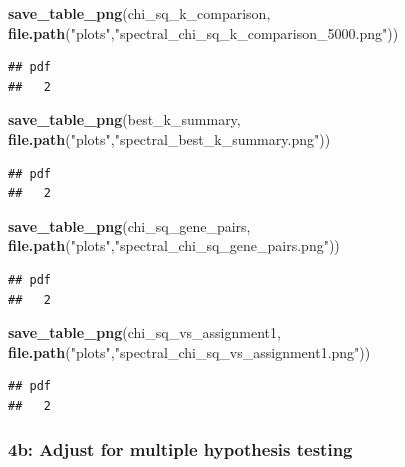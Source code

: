 \documentclass[
]{article}
\newenvironment{Shaded}{\begin{snugshade}}{\end{snugshade}}
\newcommand{\FunctionTok}[1]{\textcolor[rgb]{0.13,0.29,0.53}{\textbf{#1}}}
\newcommand{\NormalTok}[1]{#1}
\newcommand{\StringTok}[1]{\textcolor[rgb]{0.31,0.60,0.02}{#1}}
\begin{document}
\begin{Shaded}
\begin{Highlighting}[]
\FunctionTok{save\_table\_png}\NormalTok{(chi\_sq\_k\_comparison, }\FunctionTok{file.path}\NormalTok{(}\StringTok{"plots"}\NormalTok{,}\StringTok{"spectral\_chi\_sq\_k\_comparison\_5000.png"}\NormalTok{))}
\end{Highlighting}
\end{Shaded}

\begin{verbatim}
## pdf 
##   2
\end{verbatim}

\begin{Shaded}
\begin{Highlighting}[]
\FunctionTok{save\_table\_png}\NormalTok{(best\_k\_summary, }\FunctionTok{file.path}\NormalTok{(}\StringTok{"plots"}\NormalTok{,}\StringTok{"spectral\_best\_k\_summary.png"}\NormalTok{))}
\end{Highlighting}
\end{Shaded}

\begin{verbatim}
## pdf 
##   2
\end{verbatim}

\begin{Shaded}
\begin{Highlighting}[]
\FunctionTok{save\_table\_png}\NormalTok{(chi\_sq\_gene\_pairs, }\FunctionTok{file.path}\NormalTok{(}\StringTok{"plots"}\NormalTok{,}\StringTok{"spectral\_chi\_sq\_gene\_pairs.png"}\NormalTok{))}
\end{Highlighting}
\end{Shaded}

\begin{verbatim}
## pdf 
##   2
\end{verbatim}

\begin{Shaded}
\begin{Highlighting}[]
\FunctionTok{save\_table\_png}\NormalTok{(chi\_sq\_vs\_assignment1, }\FunctionTok{file.path}\NormalTok{(}\StringTok{"plots"}\NormalTok{,}\StringTok{"spectral\_chi\_sq\_vs\_assignment1.png"}\NormalTok{))}
\end{Highlighting}
\end{Shaded}

\begin{verbatim}
## pdf 
##   2
\end{verbatim}

\subsubsection{4b: Adjust for multiple hypothesis
testing}\label{b-adjust-for-multiple-hypothesis-testing}
\end{document}
